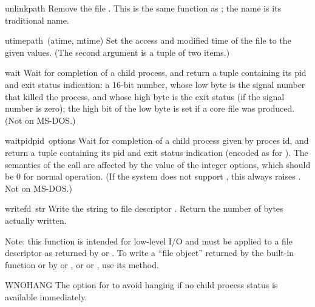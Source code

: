 \begin{funcdesc}{unlink}{path}
Remove the file .  This is the same function as ;
the  name is its traditional \UNIX{} name.
\end{funcdesc}

\begin{funcdesc}{utime}{path\, {\rm (}atime, mtime{\rm )}}
Set the access and modified time of the file to the given values.
(The second argument is a tuple of two items.)
\end{funcdesc}

\begin{funcdesc}{wait}{}
Wait for completion of a child process, and return a tuple containing
its pid and exit status indication: a 16-bit number, whose low byte is
the signal number that killed the process, and whose high byte is the
exit status (if the signal number is zero); the high bit of the low
byte is set if a core file was produced.  (Not on MS-DOS.)
\end{funcdesc}

\begin{funcdesc}{waitpid}{pid\, options}
Wait for completion of a child process given by proces id, and return
a tuple containing its pid and exit status indication (encoded as for
).  The semantics of the call are affected by the value of
the integer options, which should be 0 for normal operation.  (If the
system does not support , this always raises
.  Not on MS-DOS.)
\end{funcdesc}

\begin{funcdesc}{write}{fd\, str}
Write the string  to file descriptor .
Return the number of bytes actually written.

Note: this function is intended for low-level I/O and must be applied
to a file descriptor as returned by  or
.  To write a ``file object'' returned by the
built-in function  or by  or
, or  or , use
its  method.
\end{funcdesc}

\begin{datadesc}{WNOHANG}
The option for  to avoid hanging if no child process
status is available immediately.
\end{datadesc}


